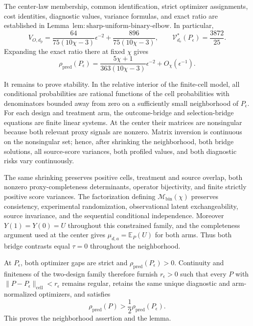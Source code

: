 The center-law membership, common identification, strict optimizer assignments, cost identities, diagnostic values, variance formulas, and exact ratio are established in Lemma~\(\mathrm{lem{:}sharp\text{-}uniform\text{-}binary\text{-}elbow}\).  In particular,
\[
 V_{O,d_{\mathrm p}}
 =\frac{64}{75(10\chi-3)}\epsilon^{-2}
 +\frac{896}{75(10\chi-3)},
 \qquad
 \mathcal V_{d_{\mathrm e}}^*(P_\epsilon)=\frac{3872}{25}.
\]
Expanding the exact ratio there at fixed \(\chi\) gives
\[
 \rho_{\mathrm{pred}}(P_\epsilon)
 =\frac{5\chi+1}{363(10\chi-3)}\epsilon^{-2}
 +O_\chi(\epsilon^{-1}). \tag{1}
\]

It remains to prove stability.  In the relative interior of the finite-cell model, all conditional probabilities are rational functions of the cell probabilities with denominators bounded away from zero on a sufficiently small neighborhood of \(P_\epsilon\).  For each design and treatment arm, the outcome-bridge and selection-bridge equations are finite linear systems.  At the center their matrices are nonsingular because both relevant proxy signals are nonzero.  Matrix inversion is continuous on the nonsingular set; hence, after shrinking the neighborhood, both bridge solutions, all source-score variances, both profiled values, and both diagnostic risks vary continuously.

The same shrinking preserves positive cells, treatment and source overlap, both nonzero proxy-completeness determinants, operator bijectivity, and finite strictly positive score variances.  The factorization defining \(\mathcal M_{\mathrm{bin}}(\chi)\) preserves consistency, experimental randomization, observational latent exchangeability, source invariance, and the sequential conditional independence.  Moreover \(Y(1)=Y(0)=U\) throughout this constrained family, and the completeness argument used at the center gives \(\mu_{d,a}=\mathbb E_P(U)\) for both arms.  Thus both bridge contrasts equal \(\tau=0\) throughout the neighborhood.

At \(P_\epsilon\), both optimizer gaps are strict and \(\rho_{\mathrm{pred}}(P_\epsilon)>0\).  Continuity and finiteness of the two-design family therefore furnish \(r_\epsilon>0\) such that every \(P\) with \(\|P-P_\epsilon\|_{\mathrm{cell}}<r_\epsilon\) remains regular, retains the same unique diagnostic and arm-normalized optimizers, and satisfies
\[
 \rho_{\mathrm{pred}}(P)>\frac12\rho_{\mathrm{pred}}(P_\epsilon).
\]
This proves the neighborhood assertion and the lemma.
